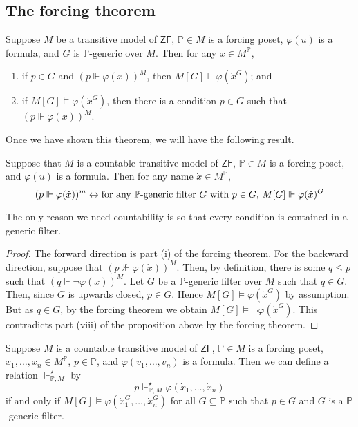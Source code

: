 \subsection{The forcing theorem}
\begin{theorem}
    Suppose \( M \) be a transitive model of \( \mathsf{ZF} \), \( \mathbb P \in M \) is a forcing poset, \( \varphi(u) \) is a formula, and \( G \) is \( \mathbb P \)-generic over \( M \).
    Then for any \( \dot x \in M^{\mathbb P} \),
    \begin{enumerate}
        \item if \( p \in G \) and \( (p \Vdash \varphi(x))^M \), then \( M[G] \vDash \varphi(\dot x^G) \); and
        \item if \( M[G] \vDash \varphi(\dot x^G) \), then there is a condition \( p \in G \) such that \( (p \Vdash \varphi(x))^M \).
    \end{enumerate}
\end{theorem}
Once we have shown this theorem, we will have the following result.
\begin{corollary}
    Suppose that \( M \) is a countable transitive model of \( \mathsf{ZF} \), \( \mathbb P \in M \) is a forcing poset, and \( \varphi(u) \) is a formula.
    Then for any name \( \dot x \in M^{\mathbb P} \),
    \[ (p \Vdash \varphi(\dot x))^m \leftrightarrow \text{for any \( \mathbb P \)-generic filter \( G \) with \( p \in G \), } M[G] \Vdash \varphi(\dot x)^G \]
\end{corollary}
The only reason we need countability is so that every condition is contained in a generic filter.
\begin{proof}
    The forward direction is part (i) of the forcing theorem.
    For the backward direction, suppose that \( (p \nVdash \varphi(\dot x))^M \).
    Then, by definition, there is some \( q \leq p \) such that \( (q \Vdash \neg\varphi(\dot x))^M \).
    Let \( G \) be a \( \mathbb P \)-generic filter over \( M \) such that \( q \in G \).
    Then, since \( G \) is upwards closed, \( p \in G \).
    Hence \( M[G] \vDash \varphi(\dot x^G) \) by assumption.
    But as \( q \in G \), by the forcing theorem we obtain \( M[G] \vDash \neg\varphi(\dot x^G) \).
    This contradicts part (viii) of the proposition above by the forcing theorem.
\end{proof}
\begin{definition}
    Suppose \( M \) is a countable transitive model of \( \mathsf{ZF} \), \( \mathbb P \in M \) is a forcing poset, \( \dot x_1, \dots, \dot x_n \in M^{\mathbb P} \), \( p \in \mathbb P \), and \( \varphi(v_1, \dots, v_n) \) is a formula.
    Then we can define a relation \( \Vdash^\star_{\mathbb P, M} \) by
    \[ p \Vdash^\star_{\mathbb P, M} \varphi(\dot x_1, \dots, \dot x_n) \]
    if and only if \( M[G] \vDash \varphi(\dot x_1^G, \dots, \dot x_n^G) \) for all \( G \subseteq \mathbb P \) such that \( p \in G \) and \( G \) is a \( \mathbb P \)-generic filter.
\end{definition}
